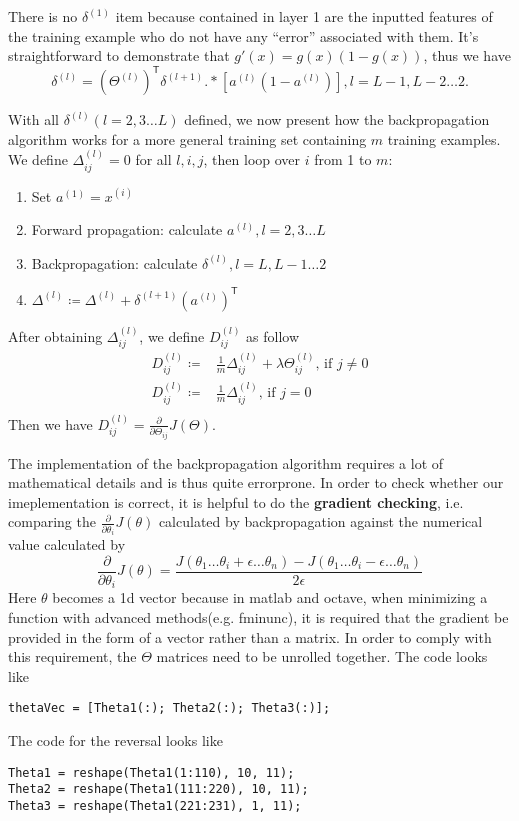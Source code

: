 There is no $\delta^{(1)}$ item because contained in layer 1 are the inputted features of the training example who do not have any ``error'' associated with them. It's straightforward to demonstrate that $g'(x) = g(x)(1 - g(x))$,  thus we have
\begin{equation}
\delta^{(l)} = (\Theta^{(l)})^{\mathsf T}\delta^{(l+1)} .* \left[a^{(l)}(1 - a^{(l)})\right], l = L - 1, L - 2 \dots 2.
\end{equation}

With all $\delta^{(l)}(l=2,3\dots L)$ defined, we now present how the backpropagation algorithm works for a more general training set containing $m$ training examples. We define $\Delta^{(l)}_{ij} = 0$ for all $l,i,j$, then loop over $i$ from 1 to $m$:
\begin{enumerate}
\item Set $a^{(1)}=x^{(i)}$
\item Forward propagation: calculate $a^{(l)}, l=2,3\dots L$
\item Backpropagation: calculate $\delta^{(l)}, l=L,L-1\dots 2$
\item $\Delta^{(l)} \coloneqq \Delta^{(l)} + \delta^{(l+1)}\left(a^{(l)}\right)^{\mathsf T}$
\end{enumerate}
After obtaining $\Delta^{(l)}_{ij}$, we define $D^{(l)}_{ij}$ as follow
\begin{equation}\begin{split}
D_{ij}^{(l)} \coloneqq & \frac{1}{m}\Delta^{(l)}_{ij} + \lambda\Theta_{ij}^{(l)}\text{, if }j\neq0\\
D_{ij}^{(l)} \coloneqq & \frac{1}{m}\Delta^{(l)}_{ij}\text{, if }j=0\\
\end{split}
\end{equation}
Then we have
$D^{(l)}_{ij} = \frac{\partial}{\partial \Theta_{ij}}J(\Theta)$.

The implementation of the backpropagation algorithm requires a lot of mathematical details and is thus quite errorprone. In order to check whether our imeplementation is correct, it is helpful to do the {\bf gradient checking}, i.e. comparing the $\frac{\partial}{\partial \theta_{i}}J(\theta)$ calculated by backpropagation against the numerical value calculated by 
$$\frac{\partial}{\partial \theta_i}J(\theta) = \frac{J(\theta_1\dots\theta_i + \epsilon\dots\theta_n)-J(\theta_1\dots\theta_i - \epsilon\dots\theta_n)}{2\epsilon}$$
Here $\theta$ becomes a 1d vector because in matlab and octave, when minimizing a function with advanced methods(e.g. fminunc), it is required that the gradient be provided in the form of a vector rather than a matrix. In order to comply with this requirement, the $\Theta$ matrices need to be unrolled together. The code looks like
\begin{lstlisting}
thetaVec = [Theta1(:); Theta2(:); Theta3(:)];
\end{lstlisting}
The code for the reversal looks like
\begin{lstlisting}
Theta1 = reshape(Theta1(1:110), 10, 11);
Theta2 = reshape(Theta1(111:220), 10, 11);
Theta3 = reshape(Theta1(221:231), 1, 11);
\end{lstlisting}

